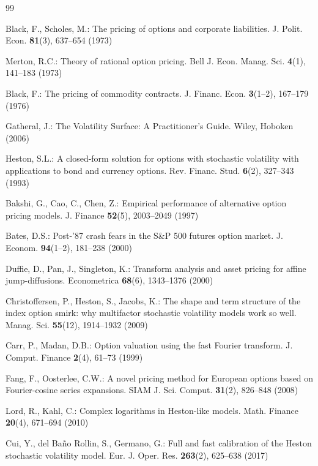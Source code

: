 \documentclass[runningheads]{llncs}
\begin{document}
\begin{thebibliography}{99}

Black, F., Scholes, M.: The pricing of options and corporate
liabilities. J. Polit. Econ. \textbf{81}(3), 637--654 (1973)

Merton, R.C.: Theory of rational option pricing. Bell J. Econ. Manag.
Sci. \textbf{4}(1), 141--183 (1973)

Black, F.: The pricing of commodity contracts. J. Financ. Econ.
\textbf{3}(1--2), 167--179 (1976)

Gatheral, J.: The Volatility Surface: A Practitioner's Guide. Wiley,
Hoboken (2006)

Heston, S.L.: A closed-form solution for options with stochastic
volatility with applications to bond and currency options. Rev. Financ.
Stud. \textbf{6}(2), 327--343 (1993)

Bakshi, G., Cao, C., Chen, Z.: Empirical performance of alternative
option pricing models. J. Finance \textbf{52}(5), 2003--2049 (1997)

Bates, D.S.: Post-'87 crash fears in the S\&P 500 futures option market.
J. Econom. \textbf{94}(1--2), 181--238 (2000)

Duffie, D., Pan, J., Singleton, K.: Transform analysis and asset pricing
for affine jump-diffusions. Econometrica \textbf{68}(6), 1343--1376
(2000)

Christoffersen, P., Heston, S., Jacobs, K.: The shape and term structure
of the index option smirk: why multifactor stochastic volatility models
work so well. Manag. Sci. \textbf{55}(12), 1914--1932 (2009)

Carr, P., Madan, D.B.: Option valuation using the fast Fourier
transform. J. Comput. Finance \textbf{2}(4), 61--73 (1999)

Fang, F., Oosterlee, C.W.: A novel pricing method for European options
based on Fourier-cosine series expansions. SIAM J. Sci. Comput.
\textbf{31}(2), 826--848 (2008)

Lord, R., Kahl, C.: Complex logarithms in Heston-like models. Math.
Finance \textbf{20}(4), 671--694 (2010)

Cui, Y., del Ba\~{n}o Rollin, S., Germano, G.: Full and fast calibration
of the Heston stochastic volatility model. Eur. J. Oper. Res.
\textbf{263}(2), 625--638 (2017)


\end{thebibliography}
\end{document}
